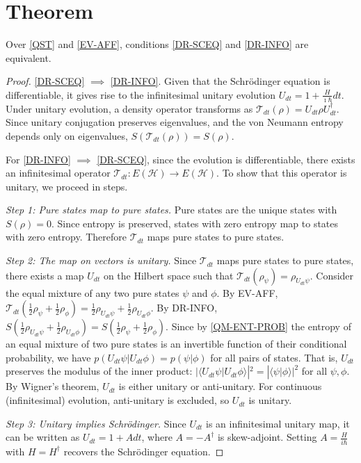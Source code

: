 \documentclass{techbrief}
\begin{document}
\section{Theorem}
\begin{thrm}
	Over \ref{QST} and \ref{EV-AFF}, conditions \ref{DR-SCEQ} and \ref{DR-INFO} are equivalent.
\end{thrm}
\begin{proof}
	\ref{DR-SCEQ} $\implies$ \ref{DR-INFO}. Given that the Schrödinger equation is differentiable, it gives rise to the infinitesimal unitary evolution $U_{dt} = 1 + \frac{H}{\imath\hbar}dt$. Under unitary evolution, a density operator transforms as $\mathcal{T}_{dt}(\rho) = U_{dt}\rho U_{dt}^\dagger$. Since unitary conjugation preserves eigenvalues, and the von Neumann entropy depends only on eigenvalues, $S(\mathcal{T}_{dt}(\rho)) = S(\rho)$.
	
	For \ref{DR-INFO} $\implies$ \ref{DR-SCEQ}, since the evolution is differentiable, there exists an infinitesimal operator $\mathcal{T}_{dt} : E(\mathcal{H}) \to E(\mathcal{H})$. To show that this operator is unitary, we proceed in steps.
	
	\emph{Step 1: Pure states map to pure states.} Pure states are the unique states with $S(\rho) = 0$. Since entropy is preserved, states with zero entropy map to states with zero entropy. Therefore $\mathcal{T}_{dt}$ maps pure states to pure states.
	
	\emph{Step 2: The map on vectors is unitary.} Since $\mathcal{T}_{dt}$ maps pure states to pure states, there exists a map $U_{dt}$ on the Hilbert space such that $\mathcal{T}_{dt}(\rho_\psi) = \rho_{U_{dt}\psi}$. Consider the equal mixture of any two pure states $\psi$ and $\phi$. By EV-AFF, $\mathcal{T}_{dt}(\frac{1}{2}\rho_\psi + \frac{1}{2}\rho_\phi) = \frac{1}{2}\rho_{U_{dt}\psi} + \frac{1}{2}\rho_{U_{dt}\phi}$. By DR-INFO, $S(\frac{1}{2}\rho_{U_{dt}\psi} + \frac{1}{2}\rho_{U_{dt}\phi}) = S(\frac{1}{2}\rho_\psi + \frac{1}{2}\rho_\phi)$. Since by \ref{QM-ENT-PROB} the entropy of an equal mixture of two pure states is an invertible function of their conditional probability, we have $p(U_{dt}\psi|U_{dt}\phi) = p(\psi|\phi)$ for all pairs of states. That is, $U_{dt}$ preserves the modulus of the inner product: $|\langle U_{dt}\psi|U_{dt}\phi\rangle|^2 = |\langle\psi|\phi\rangle|^2$ for all $\psi, \phi$. By Wigner's theorem, $U_{dt}$ is either unitary or anti-unitary. For continuous (infinitesimal) evolution, anti-unitary is excluded, so $U_{dt}$ is unitary.
	
	\emph{Step 3: Unitary implies Schrödinger.} Since $U_{dt}$ is an infinitesimal unitary map, it can be written as $U_{dt} = 1 + Adt$, where $A = - A^\dagger$ is skew-adjoint. Setting $A = \frac{H}{i\hbar}$ with $H = H^\dagger$ recovers the Schrödinger equation.
\end{proof}
\end{document}
